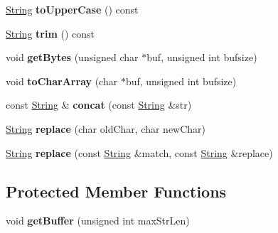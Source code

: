 \begin{DoxyCompactItemize}
\item 
\hyperlink{class_string}{String} {\bfseries to\+Upper\+Case} () const \hypertarget{class_string_a1be059135eecd087baca2174ed403516}{}\label{class_string_a1be059135eecd087baca2174ed403516}

\item 
\hyperlink{class_string}{String} {\bfseries trim} () const \hypertarget{class_string_ad3853992f01ae00f2e6ed2d4eda85fb6}{}\label{class_string_ad3853992f01ae00f2e6ed2d4eda85fb6}

\item 
void {\bfseries get\+Bytes} (unsigned char $\ast$buf, unsigned int bufsize)\hypertarget{class_string_a87ed5d0774c614c9811b9d6e3e5d36d4}{}\label{class_string_a87ed5d0774c614c9811b9d6e3e5d36d4}

\item 
void {\bfseries to\+Char\+Array} (char $\ast$buf, unsigned int bufsize)\hypertarget{class_string_add11f6222fa98444c9af6baf9d0eb874}{}\label{class_string_add11f6222fa98444c9af6baf9d0eb874}

\item 
const \hyperlink{class_string}{String} \& {\bfseries concat} (const \hyperlink{class_string}{String} \&str)\hypertarget{class_string_a458fe8623cb3447270e0c9e599bf8149}{}\label{class_string_a458fe8623cb3447270e0c9e599bf8149}

\item 
\hyperlink{class_string}{String} {\bfseries replace} (char old\+Char, char new\+Char)\hypertarget{class_string_aa3777be2f9b9dd6480a6ed23175005f5}{}\label{class_string_aa3777be2f9b9dd6480a6ed23175005f5}

\item 
\hyperlink{class_string}{String} {\bfseries replace} (const \hyperlink{class_string}{String} \&match, const \hyperlink{class_string}{String} \&replace)\hypertarget{class_string_a31420099ed8dbc81a36992b01f6c3e64}{}\label{class_string_a31420099ed8dbc81a36992b01f6c3e64}

\end{DoxyCompactItemize}
\subsection*{Protected Member Functions}
\begin{DoxyCompactItemize}
\item 
void {\bfseries get\+Buffer} (unsigned int max\+Str\+Len)\hypertarget{class_string_aa132e2b548ce6cbc48dc2761cab5c944}{}\label{class_string_aa132e2b548ce6cbc48dc2761cab5c944}

\end{DoxyCompactItemize}
